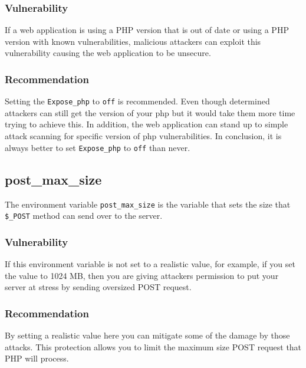 \documentclass[conference]{IEEEtran}
\begin{document}
\subsubsection{Vulnerability}
If a web application is using a PHP version that is out of date or using a PHP version with known vulnerabilities, malicious attackers can exploit this vulnerability causing the web application to be 
unsecure\cite{exposephp}.

\subsubsection{Recommendation}
Setting the \texttt{Expose\_php} to \texttt{off} is recommended. Even though determined attackers can still get the version of your php but it would take them more time trying to achieve this. In addition,
 the web application can stand up to simple attack scanning for specific version of php vulnerabilities. In conclusion, it is always better to set \texttt{Expose\_php} to \texttt{off} than never.
 
\subsection{post\_max\_size}
The environment variable \texttt{post\_max\_size} is the variable that sets the size that \texttt{\$\_POST} method can send over to the server.
\subsubsection{Vulnerability}
If this environment variable is not set to a realistic value, for example, if you set the value to 1024 MB, then you are giving attackers permission to put your server at stress by sending oversized POST request.\cite{postmaxsize}
\subsubsection{Recommendation}
By setting a realistic value here you can mitigate some of the damage by those attacks. This protection allows you to limit the maximum size POST request that PHP will process.
\end{document}
